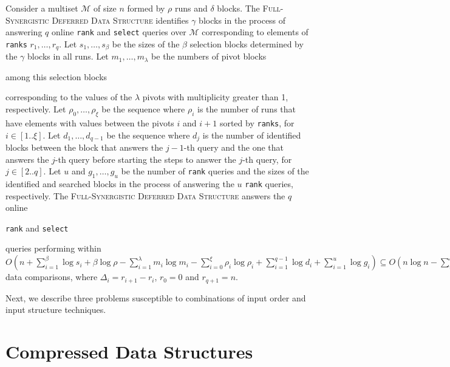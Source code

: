 \begin{theorem}\label{theo:finger}
  Consider a multiset $\mathcal{M}$ of size $n$ formed by $\rho$ runs and
  $\delta$ blocks. The \textsc{Full-Synergistic Deferred Data
    Structure} identifies $\gamma$ blocks in the process of answering
  $q$ online \texttt{rank} and \texttt{select} queries over
  $\mathcal{M}$ corresponding to elements of \texttt{ranks} $r_1,
  \dots, r_q$. Let $s_1, \dots, s_{\beta}$ be the sizes of the $\beta$
  selection blocks determined by the $\gamma$ blocks in all runs.
  Let
  $m_1, \dots, m_\lambda$ be the numbers of pivot blocks
  \begin{LONG}
    among this selection blocks
  \end{LONG}
  corresponding to the values of the $\lambda$ pivots with
  multiplicity greater than 1, respectively.  Let
  $\rho_0, \dots, \rho_\xi$ be the sequence where $\rho_i$ is the
  number of runs that have elements with values between the pivots $i$
  and $i+1$ sorted by \texttt{ranks}, for $i\in[1..\xi]$.  Let
  $d_1, \dots, d_{q-1}$ be the sequence where $d_j$ is the number
  of identified blocks between the block that answers the $j-1$-th
  query and the one that answers the $j$-th query before starting the
  steps to answer the $j$-th query, for $j\in[2..q]$. Let $u$ and
  $g_1, \dots, g_u $ be the number of \texttt{rank} queries and the
  sizes of the identified and searched blocks in the process of
  answering the $u$ \texttt{rank} queries, respectively. The
  \textsc{Full-Synergistic Deferred Data Structure} answers the $q$
  online
  \begin{LONG}
    \texttt{rank} and \texttt{select}
  \end{LONG}
queries performing within
  $O(n + \sum^{\beta}_{i=1}\log{s_i} + \beta\log{\rho} -
  \sum^{\lambda}_{i=1}m_i\log{m_i} -
  \sum^{\xi}_{i=0}\rho_i\log{\rho_i} + \sum^{q-1}_{i=1}\log{d_i} +
  \sum^{u}_{i=1}\log{g_i}) \subseteq O\left(n\log{n} -
    \sum^{q}_{i=0}\Delta_i\log{\Delta_i} + q\log{n}\right)$ data
  comparisons, where $\Delta_i = r_{i+1} - r_i$, $r_0=0$ and $r_{q+1}=n$.
\end{theorem}

Next, we describe three problems susceptible to combinations of input
order and input structure techniques.

\section{Compressed Data Structures}
\label{sec:compressed}

